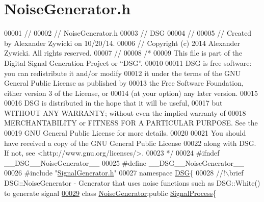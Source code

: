 \hypertarget{_noise_generator_8h_source}{\section{Noise\+Generator.\+h}
\label{_noise_generator_8h_source}
}

\begin{DoxyCode}
00001 \textcolor{comment}{//}
00002 \textcolor{comment}{//  NoiseGenerator.h}
00003 \textcolor{comment}{//  DSG}
00004 \textcolor{comment}{//}
00005 \textcolor{comment}{//  Created by Alexander Zywicki on 10/20/14.}
00006 \textcolor{comment}{//  Copyright (c) 2014 Alexander Zywicki. All rights reserved.}
00007 \textcolor{comment}{//}
00008 \textcolor{comment}{/*}
00009 \textcolor{comment}{ This file is part of the Digital Signal Generation Project or “DSG”.}
00010 \textcolor{comment}{}
00011 \textcolor{comment}{ DSG is free software: you can redistribute it and/or modify}
00012 \textcolor{comment}{ it under the terms of the GNU General Public License as published by}
00013 \textcolor{comment}{ the Free Software Foundation, either version 3 of the License, or}
00014 \textcolor{comment}{ (at your option) any later version.}
00015 \textcolor{comment}{}
00016 \textcolor{comment}{ DSG is distributed in the hope that it will be useful,}
00017 \textcolor{comment}{ but WITHOUT ANY WARRANTY; without even the implied warranty of}
00018 \textcolor{comment}{ MERCHANTABILITY or FITNESS FOR A PARTICULAR PURPOSE.  See the}
00019 \textcolor{comment}{ GNU General Public License for more details.}
00020 \textcolor{comment}{}
00021 \textcolor{comment}{ You should have received a copy of the GNU General Public License}
00022 \textcolor{comment}{ along with DSG.  If not, see <http://www.gnu.org/licenses/>.}
00023 \textcolor{comment}{ */}
00024 \textcolor{preprocessor}{#ifndef \_\_DSG\_\_NoiseGenerator\_\_}
00025 \textcolor{preprocessor}{#define \_\_DSG\_\_NoiseGenerator\_\_}
00026 \textcolor{preprocessor}{#include "\hyperlink{_signal_generator_8h}{SignalGenerator.h}"}
00027 \textcolor{keyword}{namespace }\hyperlink{namespace_d_s_g}{DSG}\{\textcolor{comment}{}
00028 \textcolor{comment}{    //!\(\backslash\)brief DSG::NoiseGenerator - Generator that uses noise functions such as DSG::White() to generate
       signal}
\hypertarget{_noise_generator_8h_source_l00029}{}\hyperlink{class_d_s_g_1_1_noise_generator}{00029} \textcolor{comment}{}    \textcolor{keyword}{class }\hyperlink{class_d_s_g_1_1_noise_generator}{NoiseGenerator}:\textcolor{keyword}{public} \hyperlink{class_d_s_g_1_1_signal_process}{SignalProcess}\{

\end{DoxyCode}
